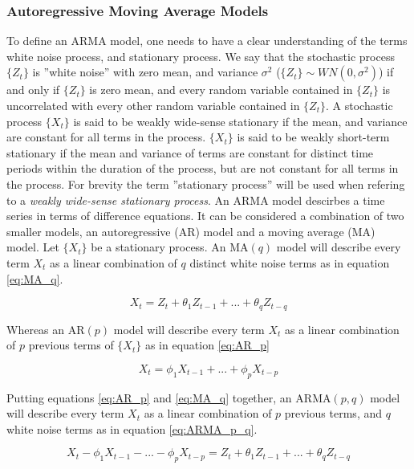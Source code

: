 \subsubsection*{Autoregressive Moving Average Models}
To define an ARMA model, one needs to have a clear understanding of the terms white noise process, and stationary process. 
We say that the stochastic process $\{Z_t\}$ is ''white noise'' with zero mean, and variance $\sigma^2$ ($\{Z_t\} \sim WN(0, \sigma^2)$) if and only if $\{Z_t\}$ is zero mean, and every random variable contained in $\{Z_t\}$ is uncorrelated with every other random variable contained in $\{Z_t\}$. 
A stochastic process $\{X_t\}$ is said to be weakly wide-sense stationary if the mean, and variance are constant for all terms in the process. 
$\{X_t\}$ is said to be weakly short-term stationary if the mean and variance of terms are constant for distinct time periods within the duration of the process, but are not constant for all terms in the process. 
For brevity the term ''stationary process'' will be used when refering to a \textit{weakly wide-sense stationary process}. 
An ARMA model descirbes a time series in terms of difference equations. 
It can be considered a combination of two smaller models, an autoregressive (AR) model and a moving average (MA) model. 
Let $\{X_t\}$ be a stationary process. 
An $\mathrm{MA}(q)$ model will describe every term $X_t$ as a linear combination of $q$ distinct white noise terms as in equation \eqref{eq:MA_q}.

\begin{equation}
    X_t = Z_{t} + \theta_1 Z_{t-1} + ... + \theta_q Z_{t-q}
    \label{eq:MA_q}
\end{equation}

Whereas an $\mathrm{AR}(p)$ model will describe every term $X_t$ as a linear combination of $p$ previous terms of $\{X_t\}$ as in equation \eqref{eq:AR_p}

\begin{equation}
    X_t = \phi_1 X_{t-1} + ... + \phi_p X_{t-p}
    \label{eq:AR_p}
\end{equation}

Putting equations \eqref{eq:AR_p} and \eqref{eq:MA_q} together, an $\mathrm{ARMA}(p,q)$ model will describe every term $X_t$ as a linear combination of $p$ previous terms, and $q$ white noise terms as in equation \eqref{eq:ARMA_p_q}.

\begin{equation}
    X_t - \phi_1 X_{t-1} - ... - \phi_p X_{t-p} = Z_{t} + \theta_1 Z_{t-1} + ... + \theta_q Z_{t-q}
    \label{eq:ARMA_p_q}
\end{equation}

